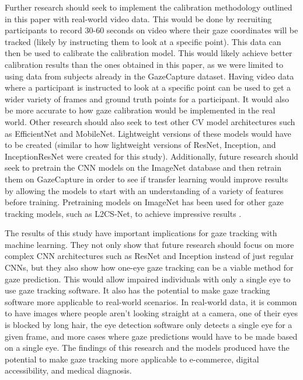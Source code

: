 \documentclass{article}
\begin{document}
Further research should seek to implement the calibration methodology outlined in this paper with real-world video data. This would be done by recruiting participants to record 30-60 seconds on video where their gaze coordinates will be tracked (likely by instructing them to look at a specific point). This data can then be used to calibrate the calibration model. This would likely achieve better calibration results than the ones obtained in this paper, as we were limited to using data from subjects already in the GazeCapture dataset. Having video data where a participant is instructed to look at a specific point can be used to get a wider variety of frames and ground truth points for a participant. It would also be more accurate to how gaze calibration would be implemented in the real world. Other research should also seek to test other CV model architectures such as EfficientNet and MobileNet. Lightweight versions of these models would have to be created (similar to how lightweight versions of ResNet, Inception, and InceptionResNet were created for this study). Additionally, future research should seek to pretrain the CNN models on the ImageNet database and then retrain them on GazeCapture in order to see if transfer learning would improve results by allowing the models to start with an understanding of a variety of features before training. Pretraining models on ImageNet has been used for other gaze tracking models, such as L2CS-Net, to achieve impressive results \cite{l2csnet}.

The results of this study have important implications for gaze tracking with machine learning. They not only show that future research should focus on more complex CNN architectures such as ResNet and Inception instead of just regular CNNs, but they also show how one-eye gaze tracking can be a viable method for gaze prediction. This would allow impaired individuals with only a single eye to use gaze tracking software. It also has the potential to make gaze tracking software more applicable to real-world scenarios. In real-world data, it is common to have images where people aren't looking straight at a camera, one of their eyes is blocked by long hair, the eye detection software only detects a single eye for a given frame, and more cases where gaze predictions would have to be made based on a single eye. The findings of this research and the models produced have the potential to make gaze tracking more applicable to e-commerce, digital accessibility, and medical diagnosis.



\printbibliography
\end{document}
